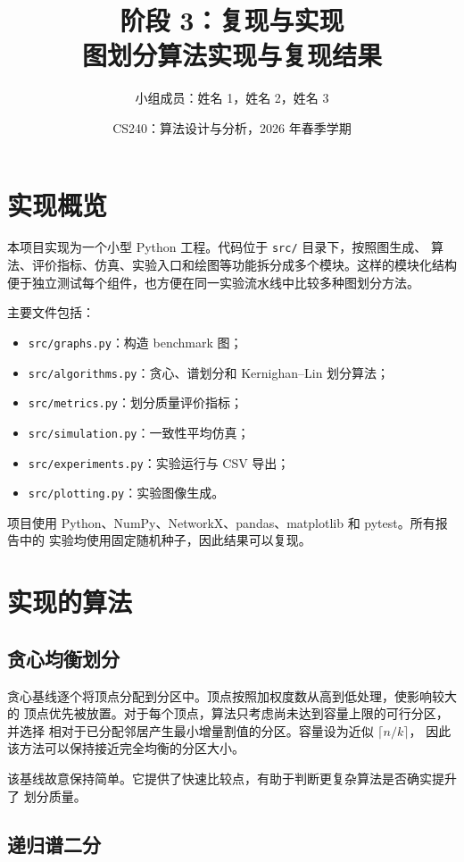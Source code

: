 \documentclass[UTF8, 11pt]{ctexart}
\title{\textbf{阶段 3：复现与实现}\\
图划分算法实现与复现结果}
\author{小组成员：姓名 1，姓名 2，姓名 3}
\date{CS240：算法设计与分析，2026 年春季学期}
\begin{document}
\maketitle

\section{实现概览}

本项目实现为一个小型 Python 工程。代码位于 \texttt{src/} 目录下，按照图生成、
算法、评价指标、仿真、实验入口和绘图等功能拆分成多个模块。这样的模块化结构
便于独立测试每个组件，也方便在同一实验流水线中比较多种图划分方法。

主要文件包括：
\begin{itemize}
    \item \texttt{src/graphs.py}：构造 benchmark 图；
    \item \texttt{src/algorithms.py}：贪心、谱划分和 Kernighan--Lin 划分算法；
    \item \texttt{src/metrics.py}：划分质量评价指标；
    \item \texttt{src/simulation.py}：一致性平均仿真；
    \item \texttt{src/experiments.py}：实验运行与 CSV 导出；
    \item \texttt{src/plotting.py}：实验图像生成。
\end{itemize}

项目使用 Python、NumPy、NetworkX、pandas、matplotlib 和 pytest。所有报告中的
实验均使用固定随机种子，因此结果可以复现。

\section{实现的算法}

\subsection{贪心均衡划分}

贪心基线逐个将顶点分配到分区中。顶点按照加权度数从高到低处理，使影响较大的
顶点优先被放置。对于每个顶点，算法只考虑尚未达到容量上限的可行分区，并选择
相对于已分配邻居产生最小增量割值的分区。容量设为近似 $\lceil n/k\rceil$，
因此该方法可以保持接近完全均衡的分区大小。

该基线故意保持简单。它提供了快速比较点，有助于判断更复杂算法是否确实提升了
划分质量。

\subsection{递归谱二分}
\end{document}
